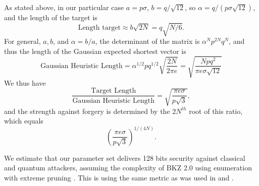 \documentclass{llncs}
\newcommand{\bfu}{{\bf u}}
\newcommand{\bfv}{{\bf v}}
\newcommand{\<}{\langle}
\renewcommand{\>}{\rangle}
\begin{document}
As stated above, in our particular case $a = p\sigma$, $b = q/\sqrt{12}$,  so
 $\alpha = q/(p\sigma \sqrt{12})$, 
and the length of the target is
$$
\text{Length target} \approx b\sqrt{2N} =  q \sqrt{N/6}.
$$ 
For general, $a,b$, and $\alpha = b/a$, 
the determinant of the matrix is $\alpha^Np^{2N}q^N$, and thus the length of the Gaussian expected shortest vector is 
$$
\text{Gaussian Heuristic Length} =\alpha^{1/2}pq^{1/2} \sqrt{\frac{2N}{2\pi e}}=\sqrt{\frac{Npq^2}{\pi e\sigma \sqrt{12}}}
$$
We thus have 
$$
\frac{\text{Target Length}}{\text{Gaussian Heuristic Length}}
 = \sqrt{\frac{\pi e \sigma }{p \sqrt{3}}},
$$
and the strength against forgery is determined by the $2N^{th}$ root of this ratio, which equals
$$\left(\frac{\pi e\sigma }{p\sqrt{3}}\right)^{1/(4N)}.$$


We estimate that our parameter set delivers 128 bits security against classical
and quantum attackers, assuming the complexity of BKZ 2.0 using
enumeration with extreme pruning \cite{BKZ2,GNR10}. This is using the same metric as was used in \cite{DBLP:conf/crypto/DucasDLL13} and \cite{DBLP:conf/pqcrypto/HoffsteinPSSW14}.
\end{document}
